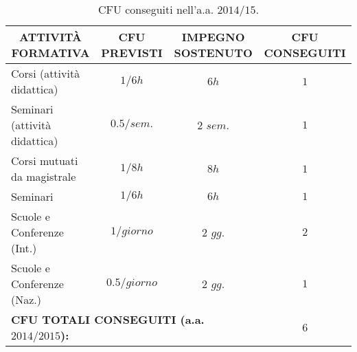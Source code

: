 \documentclass[a4paper,12pt]{article}
\begin{document}
\begin{table}[h]
    \begin{tiny}
        \centering
        \caption{CFU conseguiti nell'a.a. $2014/15$.}
            \begin{tabular}{|c|c||c|c|}
                 \hline
                 \textbf{ATTIVIT\`{A} FORMATIVA} & \textbf{CFU PREVISTI} & \textbf{IMPEGNO SOSTENUTO} & \textbf{CFU CONSEGUITI} \\ \hline\hline
                 \multicolumn{1}{|l|}{Corsi (attivit\`{a} didattica)} & $1/6h$ & $6h$ & $1$ \\ \hline
                 \multicolumn{1}{|l|}{Seminari (attivit\`{a} didattica)} & $0.5/sem.$ & $2$ $sem.$ & $1$ \\ \hline
                 \multicolumn{1}{|l|}{Corsi mutuati da magistrale} & $1/8h$ & $8h$ & $1$ \\ \hline
                 \multicolumn{1}{|l|}{Seminari} & $1/6h$ & $6h$ & $1$ \\ \hline
                 \multicolumn{1}{|l|}{Scuole e Conferenze (Int.)} & $1/giorno$ & $2$ $gg.$ & $2$ \\ \hline
                 \multicolumn{1}{|l|}{Scuole e Conferenze (Naz.)} & $0.5/giorno$ & $2$ $gg.$ & $1$ \\ \hline\hline
                 \multicolumn{3}{|l|}{\textbf{CFU TOTALI CONSEGUITI (a.a. $2014/2015$):}} & \textbf{$6$} \\
                 \hline
            \end{tabular}
    \end{tiny}
\end{table}
\end{document}
